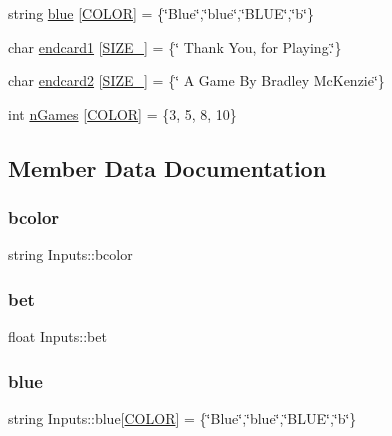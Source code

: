 \begin{DoxyCompactItemize}
string \hyperlink{struct_inputs_a685a6f5b41c965ecc2ff5ede529649da}{blue} \mbox{[}\hyperlink{main_8cpp_aa6d8034c897057de595a4511a4e7a837}{C\+O\+L\+OR}\mbox{]} = \{\char`\"{}Blue\char`\"{},\char`\"{}blue\char`\"{},\char`\"{}B\+L\+UE\char`\"{},\char`\"{}b\char`\"{}\}
\item 
char \hyperlink{struct_inputs_aeaa5f5939511046bc20580b4f9ffb4af}{endcard1} \mbox{[}\hyperlink{main_8cpp_a449535d4215a26529b13febc509c199c}{S\+I\+Z\+E\+\_}\mbox{]} = \{\char`\"{} Thank You, for Playing.\char`\"{}\}
\item 
char \hyperlink{struct_inputs_a1b0aa4e5a7bbc8c59633477ab06b90ec}{endcard2} \mbox{[}\hyperlink{main_8cpp_aef76f3385c12d0d696e38d02a917359f}{S\+I\+Z\+E\+\_}\mbox{]} = \{\char`\"{} A Game By Bradley Mc\+Kenzie\char`\"{}\}
\item 
int \hyperlink{struct_inputs_a8b7271740a32d3d765130231e98dee68}{n\+Games} \mbox{[}\hyperlink{main_8cpp_aa6d8034c897057de595a4511a4e7a837}{C\+O\+L\+OR}\mbox{]} = \{3, 5, 8, 10\}
\end{DoxyCompactItemize}


\subsection{Member Data Documentation}
\mbox{\label{struct_inputs_a7a35f3dd65cc7f24cd3e4940bd36fa74}} 
\subsubsection{\texorpdfstring{bcolor}{bcolor}}
{\footnotesize\ttfamily string Inputs\+::bcolor}

\mbox{\label{struct_inputs_af2dd0562ce671279d010f1f6c927e719}} 
\subsubsection{\texorpdfstring{bet}{bet}}
{\footnotesize\ttfamily float Inputs\+::bet}

\mbox{\label{struct_inputs_a685a6f5b41c965ecc2ff5ede529649da}} 
\subsubsection{\texorpdfstring{blue}{blue}}
{\footnotesize\ttfamily string Inputs\+::blue\mbox{[}\hyperlink{main_8cpp_aa6d8034c897057de595a4511a4e7a837}{C\+O\+L\+OR}\mbox{]} = \{\char`\"{}Blue\char`\"{},\char`\"{}blue\char`\"{},\char`\"{}B\+L\+UE\char`\"{},\char`\"{}b\char`\"{}\}}

